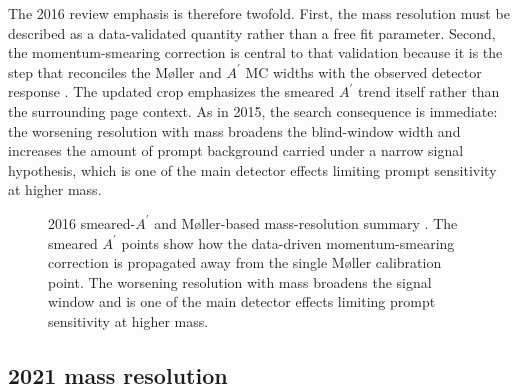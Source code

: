 The 2016 review emphasis is therefore twofold. First, the mass resolution must be
described as a data-validated quantity rather than a free fit parameter. Second, the
momentum-smearing correction is central to that validation because it is the step that
reconciles the M{\o}ller and $A^\prime$ MC widths with the observed detector response
\cite{HPS2016BumpInternal,HPS2016PromptLong}. The updated crop emphasizes the smeared
$A^\prime$ trend itself rather than the surrounding page context. As in 2015, the
search consequence is immediate: the worsening resolution with mass broadens the
blind-window width and increases the amount of prompt background carried under a narrow
signal hypothesis, which is one of the main detector effects limiting prompt
sensitivity at higher mass.

\begin{figure}[H]
\centering
{}
\caption{2016 smeared-$A^\prime$ and M{\o}ller-based mass-resolution summary
\cite{HPS2016BumpInternal}. The smeared $A^\prime$ points show how the data-driven
momentum-smearing correction is propagated away from the single M{\o}ller calibration
point. The worsening resolution with mass broadens the signal window and is one of the
main detector effects limiting prompt sensitivity at higher mass.}
\label{fig:2016-resolution}
\end{figure}

\subsection{2021 mass resolution}
\label{sec:massres-2021}

